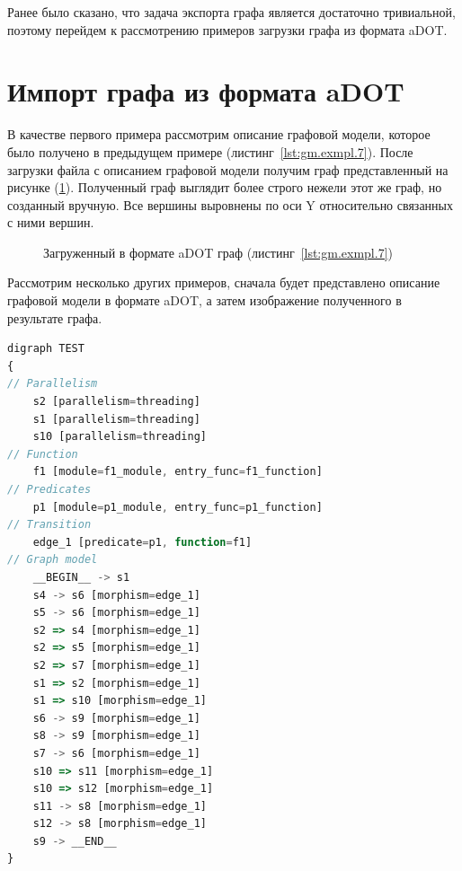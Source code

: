 Ранее было сказано, что задача экспорта графа является достаточно тривиальной, поэтому перейдем к рассмотрению примеров загрузки графа из формата aDOT.

\section{Импорт графа из формата aDOT}

В качестве первого примера рассмотрим описание графовой модели, которое было получено в предыдущем примере (листинг~\ref{lst:gm.exmpl.7}). После загрузки файла с описанием графовой модели получим граф представленный на рисунке (\ref{fig:example_1_imported}). Полученный граф выглядит более строго нежели этот же граф, но созданный вручную. Все вершины выровнены по оси Y относительно связанных с ними вершин.

\begin{figure}[ht!]
\caption{Загруженный в формате aDOT граф (листинг~\ref{lst:gm.exmpl.7})}
\label{fig:example_1_imported}
\end{figure}

Рассмотрим несколько других примеров, сначала будет представлено описание графовой модели в формате aDOT, а затем изображение полученного в результате графа.

\begin{lstlisting}[label={lst:gm.exmpl.8}, caption={Пример описание графовой модели в формате aDOT}, language=JavaScript]
digraph TEST
{
// Parallelism
	s2 [parallelism=threading]
	s1 [parallelism=threading]
	s10 [parallelism=threading]
// Function
	f1 [module=f1_module, entry_func=f1_function]
// Predicates
	p1 [module=p1_module, entry_func=p1_function]
// Transition
	edge_1 [predicate=p1, function=f1]
// Graph model
	__BEGIN__ -> s1
	s4 -> s6 [morphism=edge_1]
	s5 -> s6 [morphism=edge_1]
	s2 => s4 [morphism=edge_1]
	s2 => s5 [morphism=edge_1]
	s2 => s7 [morphism=edge_1]
	s1 => s2 [morphism=edge_1]
	s1 => s10 [morphism=edge_1]
	s6 -> s9 [morphism=edge_1]
	s8 -> s9 [morphism=edge_1]
	s7 -> s6 [morphism=edge_1]
	s10 => s11 [morphism=edge_1]
	s10 => s12 [morphism=edge_1]
	s11 -> s8 [morphism=edge_1]
	s12 -> s8 [morphism=edge_1]
	s9 -> __END__ 
}
\end{lstlisting}

